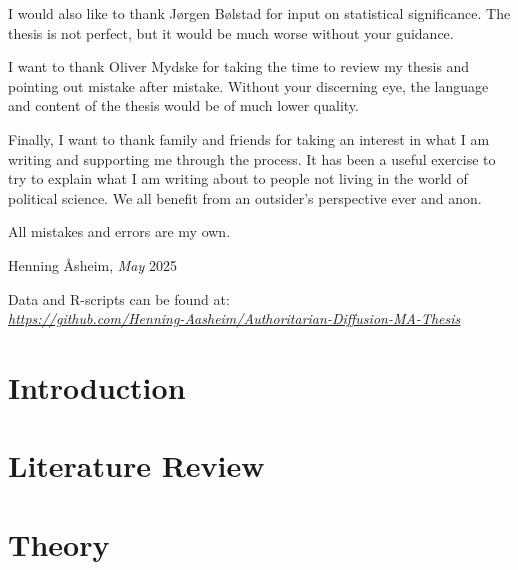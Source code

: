 \documentclass[12pt]{report} %
\begin{document}
I would also like to thank Jørgen Bølstad for input on statistical significance. The thesis is not perfect, but it would be much worse without your guidance.

I want to thank Oliver Mydske for taking the time to review my thesis and pointing out mistake after mistake. Without your discerning eye, the language and content of the thesis would be of much lower quality. 

Finally, I want to thank family and friends for taking an interest in what I am writing and supporting me through the process. It has been a useful exercise to try to explain what I am writing about to people not living in the world of political science. We all benefit from an outsider's perspective ever and anon.

\vspace{5mm}
\noindent
All mistakes and errors are my own. 

\vspace{5mm}
\noindent
Henning Åsheim, \textit{May} 2025

\newpage
\thispagestyle{empty}
\vspace*{\fill}
\begin{center}
    Data and R-scripts can be found at: \\
    \href{https://github.com/Henning-Aasheim/Authoritarian-Diffusion-MA-Thesis}{\textit{https://github.com/Henning-Aasheim/Authoritarian-Diffusion-MA-Thesis}}
\end{center}
\vspace*{\fill}

\newpage

\tableofcontents

\listoffigures

\listoftables

\chapter{Introduction} \label{chp:introduction}


\chapter{Literature Review} \label{chp:literature}


\chapter{Theory} \label{chp:theory}

\end{document}
